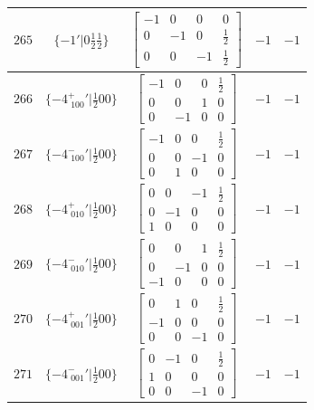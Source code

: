 \documentclass[fleqn,8pt]{jsarticle}
\begin{document}
\begin{longtable}{ccccc}
$ 265 $ & $ \{-1{}'|0 \frac{1}{2} \frac{1}{2}\} $ & $ \begin{bmatrix} -1 & 0 & 0 & 0 \\ 0 & -1 & 0 & \frac{1}{2} \\ 0 & 0 & -1 & \frac{1}{2} \end{bmatrix} $ & $ -1 $ & $ -1 $ \\ \hline
$ 266 $ & $ \{-4^{+}_{\,\,100}{}'|\frac{1}{2} 0 0\} $ & $ \begin{bmatrix} -1 & 0 & 0 & \frac{1}{2} \\ 0 & 0 & 1 & 0 \\ 0 & -1 & 0 & 0 \end{bmatrix} $ & $ -1 $ & $ -1 $ \\ \hline
$ 267 $ & $ \{-4^{-}_{\,\,100}{}'|\frac{1}{2} 0 0\} $ & $ \begin{bmatrix} -1 & 0 & 0 & \frac{1}{2} \\ 0 & 0 & -1 & 0 \\ 0 & 1 & 0 & 0 \end{bmatrix} $ & $ -1 $ & $ -1 $ \\ \hline
$ 268 $ & $ \{-4^{+}_{\,\,010}{}'|\frac{1}{2} 0 0\} $ & $ \begin{bmatrix} 0 & 0 & -1 & \frac{1}{2} \\ 0 & -1 & 0 & 0 \\ 1 & 0 & 0 & 0 \end{bmatrix} $ & $ -1 $ & $ -1 $ \\ \hline
$ 269 $ & $ \{-4^{-}_{\,\,010}{}'|\frac{1}{2} 0 0\} $ & $ \begin{bmatrix} 0 & 0 & 1 & \frac{1}{2} \\ 0 & -1 & 0 & 0 \\ -1 & 0 & 0 & 0 \end{bmatrix} $ & $ -1 $ & $ -1 $ \\ \hline
$ 270 $ & $ \{-4^{+}_{\,\,001}{}'|\frac{1}{2} 0 0\} $ & $ \begin{bmatrix} 0 & 1 & 0 & \frac{1}{2} \\ -1 & 0 & 0 & 0 \\ 0 & 0 & -1 & 0 \end{bmatrix} $ & $ -1 $ & $ -1 $ \\ \hline
$ 271 $ & $ \{-4^{-}_{\,\,001}{}'|\frac{1}{2} 0 0\} $ & $ \begin{bmatrix} 0 & -1 & 0 & \frac{1}{2} \\ 1 & 0 & 0 & 0 \\ 0 & 0 & -1 & 0 \end{bmatrix} $ & $ -1 $ & $ -1 $ \\ \hline

\end{longtable}
\end{document}
